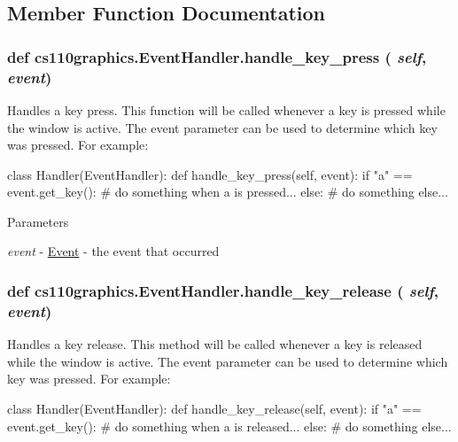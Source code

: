 \subsection{Member Function Documentation}
\hypertarget{classcs110graphics_1_1EventHandler_af3fb3531d0b23f1430a830586cd07906}{
\subsubsection[{handle\_\-key\_\-press}]{\setlength{\rightskip}{0pt plus 5cm}def cs110graphics.EventHandler.handle\_\-key\_\-press ( {\em self}, \/   {\em event})}}
\label{classcs110graphics_1_1EventHandler_af3fb3531d0b23f1430a830586cd07906}


Handles a key press. This function will be called whenever a key is pressed while the window is active. The event parameter can be used to determine which key was pressed. For example: 
\begin{DoxyCode}
 class Handler(EventHandler):
     def handle_key_press(self, event):
         if "a" == event.get_key():
             # do something when a is pressed...
         else:
             # do something else...
\end{DoxyCode}
 
\begin{DoxyParams}{Parameters}
\item[{\em event}]-\/ \hyperlink{classcs110graphics_1_1Event}{Event} -\/ the event that occurred \end{DoxyParams}
\hypertarget{classcs110graphics_1_1EventHandler_a2849f60251baa44252992162521f2473}{
\subsubsection[{handle\_\-key\_\-release}]{\setlength{\rightskip}{0pt plus 5cm}def cs110graphics.EventHandler.handle\_\-key\_\-release ( {\em self}, \/   {\em event})}}
\label{classcs110graphics_1_1EventHandler_a2849f60251baa44252992162521f2473}


Handles a key release. This method will be called whenever a key is released while the window is active. The event parameter can be used to determine which key was pressed. For example: 
\begin{DoxyCode}
 class Handler(EventHandler):
     def handle_key_release(self, event):
         if "a" == event.get_key():
             # do something when a is released...
         else:
             # do something else...
\end{DoxyCode}
 
